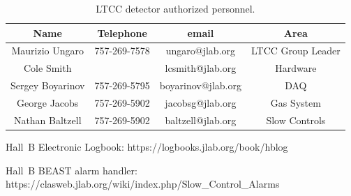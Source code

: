 \documentclass{article}
\begin{document}
\begin{table}[ht]
\begin{center}
\begin{tabular} {|c|c|c|c|} \hline
Name                 & Telephone         & email                    & Area             \\ \hline \hline
Maurizio Ungaro  & 757-269-7578  & ungaro@jlab.org    & LTCC Group Leader\\ \hline
Cole Smith          &                         & lcsmith@jlab.org    & Hardware         \\ \hline
Sergey Boyarinov & 757-269-5795 & boyarinov@jlab.org & DAQ              \\ \hline
George Jacobs     & 757-269-5902 & jacobsg@jlab.org    & Gas System    \\ \hline
Nathan Baltzell     & 757-269-5902 & baltzell@jlab.org     & Slow Controls    \\ \hline
\end{tabular}
\caption{LTCC detector authorized personnel.}
\label{expert-list}
\end{center}
\end{table}



\clearpage



\begin{thebibliography}{99}

Hall~B Electronic Logbook: https://logbooks.jlab.org/book/hblog

Hall~B BEAST alarm handler: \\
https://clasweb.jlab.org/wiki/index.php/Slow\_Control\_Alarms


\end{thebibliography}
\end{document}
